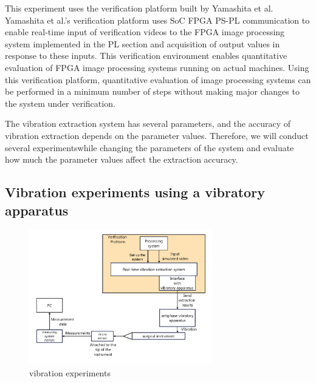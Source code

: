 
This experiment uses the verification platform built by Yamashita et al.\cite{bib:kensyo_eng}
Yamashita et al.'s verification platform uses SoC FPGA PS-PL communication
to enable real-time input of verification videos to the FPGA image processing system
implemented in the PL section and acquisition of output values in response to these inputs.
This verification environment enables quantitative evaluation
of FPGA image processing systems running on actual machines.
Using this verification platform, quantitative evaluation of
image processing systems can be performed in a minimum number of steps
without making major changes to the system under verification.


The vibration extraction system has several parameters,
and the accuracy of vibration extraction depends on the parameter values.
Therefore, we will conduct several experimentswhile changing the parameters
of the system and evaluate how much the parameter values affect the extraction accuracy.



\subsection{Vibration experiments using a vibratory apparatus}\label{subsection:add_experiment}

\begin{figure}[tb]
  \centering
  \includegraphics[width = 8cm,pagebox=cropbox,clip]{img/vibration_test.pdf}
  \caption{vibration experiments}
  \label{figure:vibration_test}
\end{figure}


